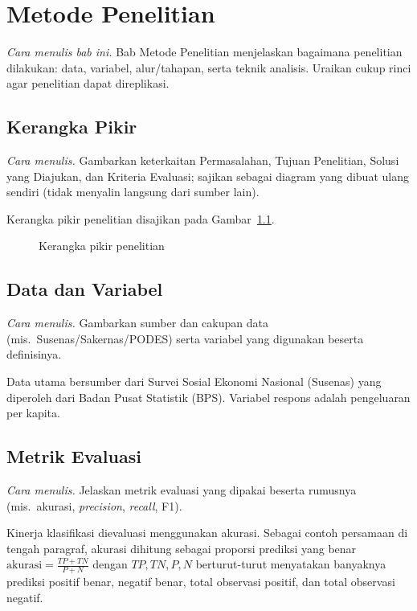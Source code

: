 \chapter{Metode Penelitian}
\emph{Cara menulis bab ini.} Bab Metode Penelitian menjelaskan bagaimana penelitian dilakukan: data, variabel, alur/tahapan, serta teknik analisis. Uraikan cukup rinci agar penelitian dapat direplikasi.


\section{Kerangka Pikir}
\emph{Cara menulis.} Gambarkan keterkaitan Permasalahan, Tujuan Penelitian, Solusi yang Diajukan, dan Kriteria Evaluasi; sajikan sebagai diagram yang dibuat ulang sendiri (tidak menyalin langsung dari sumber lain).

Kerangka pikir penelitian disajikan pada Gambar~\ref{gbr:kerangka}.

\begin{figure}[H]
\centering
{}
\caption{Kerangka pikir penelitian}
\label{gbr:kerangka}
\end{figure}

\section{Data dan Variabel}
\emph{Cara menulis.} Gambarkan sumber dan cakupan data (mis.\ Susenas/Sakernas/PODES) serta variabel yang digunakan beserta definisinya.

Data utama bersumber dari Survei Sosial Ekonomi Nasional (Susenas) yang diperoleh
dari Badan Pusat Statistik (BPS). Variabel respons adalah pengeluaran per kapita.

\section{Metrik Evaluasi}
\emph{Cara menulis.} Jelaskan metrik evaluasi yang dipakai beserta rumusnya (mis.\ akurasi, \emph{precision}, \emph{recall}, F1).

Kinerja klasifikasi dievaluasi menggunakan akurasi. Sebagai contoh persamaan di
tengah paragraf, akurasi dihitung sebagai proporsi prediksi yang benar
$\mathrm{akurasi} = \frac{TP+TN}{P+N}$ dengan $TP,TN,P,N$ berturut-turut menyatakan
banyaknya prediksi positif benar, negatif benar, total observasi positif, dan
total observasi negatif.

